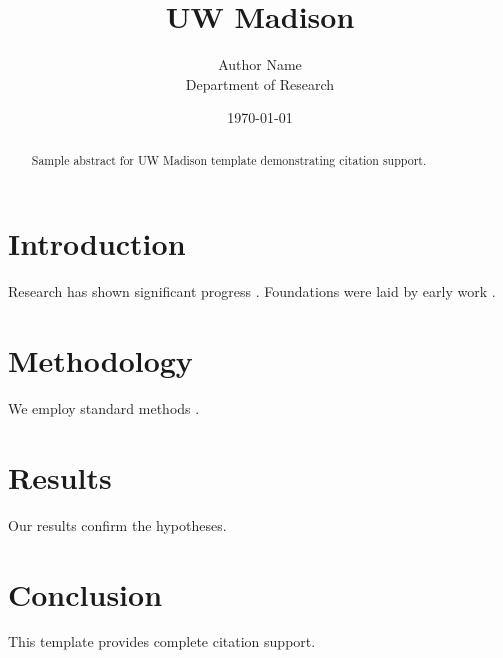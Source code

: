 \documentclass{thesis_wisconsin}
\title{UW Madison}
\author{Author Name \\ \small Department of Research}
\date{\today}
\begin{document}
\maketitle

\begin{abstract}
Sample abstract for UW Madison template demonstrating citation support.
\end{abstract}

\section{Introduction}
Research has shown significant progress \citep{einstein1905}. Foundations were laid by early work \citep{turing1950}.

\section{Methodology}
We employ standard methods \citep{knuth1984}.

\section{Results}
Our results confirm the hypotheses.

\section{Conclusion}
This template provides complete citation support.



\end{document}
